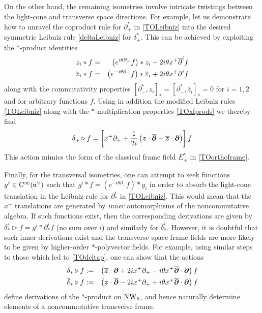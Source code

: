 On the other hand, the remaining isometries involve intricate twistings between
the light-cone and transverse space directions. For example, let us demonstrate
how to unravel the coproduct rule for $\partial_+^*$ in \eqref{TOLeibniz} into
the desired symmetric Leibniz rule \eqref{deltaLeibniz} for $\delta_+^*$. This
can be achieved by exploiting the $*$-product identities
\begin{eqnarray}
  \label{TOstarprodcomm}
  z_i*f&=&\bigl( e^{ i \theta \partial_-}f\bigr)*z_i-2 i \theta 
  x^+ \overline{\partial}^{ i}f\\
  \overline{z}_i*f&=&\bigl( e^{- i \theta \partial_-}f\bigr)*
  \overline{z}_i+2 i \theta x^+ \partial^if \nonumber
\end{eqnarray}
along with the commutativity properties
$[\partial_-^*,z_i]_*=[\partial_-^*,\overline{z}_i]_*=0$ for $i=1,2$ and for
arbitrary functions $f$. Using in addition the modified Leibniz rules
\eqref{TOLeibniz} along with the $*$-multiplication properties \eqref{TOxfprods}
we thereby find
\begin{equation}
  \label{TOdeltap}
  \delta_+\triangleright f=\left[x^+ \partial_++ \frac1{2 i }  
    \left({{\boldsymbol {z} }}\cdot\overline{{{\boldsymbol {\partial} }}}+\overline{{{\boldsymbol {z} }}}\cdot{{\boldsymbol {\partial} }}\right)
  \right]f  
\end{equation}
This action mimics the form of the classical frame field $E_+^*$ in
\eqref{TOorthoframe}.

Finally, for the transversal isometries, one can attempt to seek functions
$g^i\in{\rm C}^\infty({\mathfrak n}^\vee)$ such that $g^i*f=( e^{- i
  \theta \partial_-}f)*g_i$ in order to absorb the light-cone translation in the
Leibniz rule for $\partial_*^i$ in \eqref{TOLeibniz}. This would mean that the
$x^-$ translations are generated by {\it inner} automorphisms of the
noncommutative algebra. If such functions exist, then the corresponding
derivations are given by $\delta^i_*\triangleright f=g^i*\partial_*^if$ (no sum
over $i$) and similarly for $\overline{\delta}^{ i}_*$. However, it is doubtful
that such inner derivations exist and the transverse space frame fields are more
likely to be given by higher-order $*$-polyvector fields. For example, using
similar steps to those which led to \eqref{TOdeltap}, one can show that the
actions
\begin{eqnarray}
  \label{TOdeltatransv}
  \delta_*\triangleright f&:=&\left( \overline{{{\boldsymbol {z} }}}\cdot{{\boldsymbol {\partial} }}+2 i 
    x^+ \partial_+- i \theta x^+ \overline{{{\boldsymbol {\partial} }}}\cdot{{\boldsymbol {\partial} }}\right)f\\
  \overline{\delta}_*\triangleright f&:=&\left({{{\boldsymbol {z} }}}\cdot
    \overline{{{\boldsymbol {\partial} }}}-2 i 
    x^+ \partial_++ i \theta x^+ \overline{{{\boldsymbol {\partial} }}}\cdot{{\boldsymbol {\partial} }}\right)f\nonumber
\end{eqnarray}
define derivations of the $*$-product on $\operatorname{NW}_6$, and hence naturally
determine elements of a noncommutative transverse frame.

